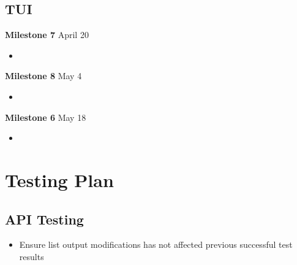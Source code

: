 \documentclass[11pt]{article}
\begin{document}
\subsection*{TUI}
\textbf{Milestone 7} April 20
\begin{itemize}
  \item
\end{itemize}
\textbf{Milestone 8} May 4
\begin{itemize}
  \item
\end{itemize}
\textbf{Milestone 6} May 18
\begin{itemize}
  \item
\end{itemize}

\section*{Testing Plan}

\subsection*{API Testing}
\begin{itemize}
  \item Ensure list output modifications has not affected previous 
    successful test results
\end{itemize}
\end{document}
